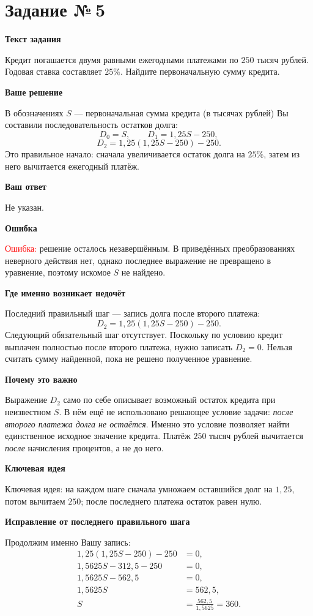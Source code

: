 \documentclass[12pt,a4paper]{article}
\newcommand{\subpart}[1]{\par\medskip\noindent\textbf{#1}\par\nobreak\smallskip}
\begin{document}
\section*{Задание №\,5}
\subpart{Текст задания}
Кредит погашается двумя равными ежегодными платежами по $250$ тысяч рублей.
Годовая ставка составляет $25\%$. Найдите первоначальную сумму кредита.

\subpart{Ваше решение}
В обозначениях $S$ --- первоначальная сумма кредита (в тысячах рублей)
Вы составили последовательность остатков долга:
\[
D_0=S,\qquad D_1=1{,}25S-250,
\]
\[
D_2=1{,}25(1{,}25S-250)-250.
\]
Это правильное начало: сначала увеличивается остаток долга на $25\%$,
затем из него вычитается ежегодный платёж.

\subpart{Ваш ответ}
Не указан.

\subpart{Ошибка}
\textcolor{red}{Ошибка:} решение осталось незавершённым.
В приведённых преобразованиях неверного действия нет, однако последнее
выражение не превращено в уравнение, поэтому искомое $S$ не найдено.

\subpart{Где именно возникает недочёт}
Последний правильный шаг --- запись долга после второго платежа:
\[
D_2=1{,}25(1{,}25S-250)-250.
\]
Следующий обязательный шаг отсутствует. Поскольку по условию кредит
выплачен полностью после второго платежа, нужно записать $D_2=0$.
Нельзя считать сумму найденной, пока не решено полученное уравнение.

\subpart{Почему это важно}
Выражение $D_2$ само по себе описывает возможный остаток кредита при
неизвестном $S$. В нём ещё не использовано решающее условие задачи:
\emph{после второго платежа долга не остаётся}. Именно это условие
позволяет найти единственное исходное значение кредита. Платёж $250$
тысяч рублей вычитается \emph{после} начисления процентов, а не до него.

\subpart{Ключевая идея}
\textcolor{blue!60!black}{Ключевая идея:} на каждом шаге сначала
умножаем оставшийся долг на $1{,}25$, потом вычитаем $250$;
после последнего платежа остаток равен нулю.

\subpart{Исправление от последнего правильного шага}
Продолжим именно Вашу запись:
\begin{align*}
1{,}25(1{,}25S-250)-250&=0,\\
1{,}5625S-312{,}5-250&=0,\\
1{,}5625S-562{,}5&=0,\\
1{,}5625S&=562{,}5,\\
S&=\frac{562{,}5}{1{,}5625}=360.
\end{align*}
\end{document}
